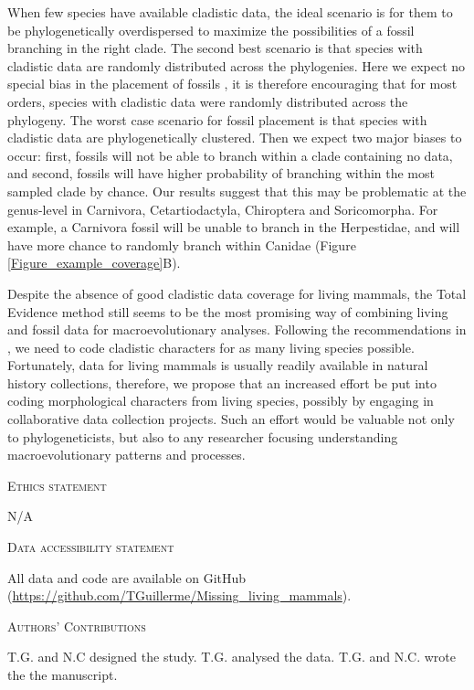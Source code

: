 \documentclass[12pt,letterpaper]{article}
\renewcommand{\section}[1]{%
\bigskip
\begin{center}
\begin{Large}
\normalfont\scshape #1
\medskip
\end{Large}
\end{center}}
\begin{document}
When few species have available cladistic data, the ideal scenario is for them to be phylogenetically overdispersed to maximize the possibilities of a fossil branching in the right clade.
The second best scenario is that species with cladistic data are randomly distributed across the phylogenies. 
Here we expect no special bias in the placement of fossils \cite{GuillermeCooper}, it is therefore encouraging that for most orders, species with cladistic data were randomly distributed across the phylogeny.
The worst case scenario for fossil placement is that species with cladistic data are phylogenetically clustered. 
Then we expect two major biases to occur: first, fossils will not be able to branch within a clade containing no data, and second, fossils will have higher probability of branching within the most sampled clade by chance. 
Our results suggest that this may be problematic at the genus-level in Carnivora, Cetartiodactyla, Chiroptera and Soricomorpha. 
For example, a Carnivora fossil will be unable to branch in the Herpestidae, and will have more chance to randomly branch within Canidae (Figure \ref{Figure_example_coverage}B).

Despite the absence of good cladistic data coverage for living mammals, the Total Evidence method still seems to be the most promising way of combining living and fossil data for macroevolutionary analyses. 
Following the recommendations in \cite{GuillermeCooper}, we need to code cladistic characters for as many living species possible. 
Fortunately, data for living mammals is usually readily available in natural history collections, therefore, we propose that an increased effort be put into coding morphological characters from living species, possibly by engaging in collaborative data collection projects.
Such an effort would be valuable not only to phylogeneticists, but also to any researcher focusing understanding macroevolutionary patterns and processes.

\section{Ethics statement}
N/A
\section{Data accessibility statement}
All data and code are available on GitHub (\url{https://github.com/TGuillerme/Missing_living_mammals}).
\section{Authors' Contributions}
T.G. and N.C designed the study. T.G. analysed the data. T.G. and N.C. wrote the the manuscript.
\end{document}
